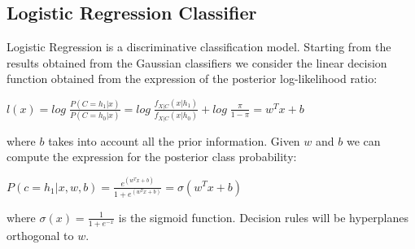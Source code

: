\documentclass[10pt, a4paper, twocolumn]{article} %
\begin{document}
\subsection{Logistic Regression Classifier}
Logistic Regression is a discriminative classification model. Starting from the results obtained
from the Gaussian classifiers we consider the linear decision function obtained from the expression
of the posterior log-likelihood ratio:
\begin{center}
	\begin{math}
		l(x) = log\;\frac{P(C=h_1|x)}{P(C=h_0|x)}=log\;\frac{f_{X|C}(x|h_1)}{f_{X|C}(x|h_0)} + log\;\frac{\pi}{1-\pi} = w^Tx + b
	\end{math}
\end{center}
where $b$ takes into account all the prior information. Given $w$ and $b$ we can compute the
expression for the posterior class probability:
\begin{center}
	\begin{math}
		P(c=h_1|x,w,b)=\frac{e^{(w^Tx + b)}}{1+e^{(w^Tx+b)}}=\sigma(w^Tx+b)
	\end{math}
\end{center}
where $\sigma(x)=\frac{1}{1+e^{-x}}$ is the sigmoid function. Decision rules will be hyperplanes
orthogonal to $w$.
\end{document}
